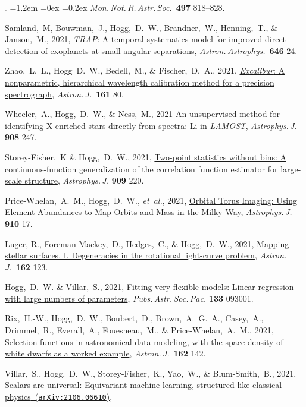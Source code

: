 \documentclass[10pt,letterpaper]{article}
\newcommand{\acronym}[1]{{\small{#1}}}
\newcommand{\foreign}[1]{\textsl{#1}}
\newcommand{\etal}{\foreign{et~al.}}
\newcommand{\project}[1]{\textsl{#1}}
\newcommand{\doi}[2]{\href{http://dx.doi.org/#1}{{#2}}}
\newcommand{\arxiv}[2]{\href{http://arxiv.org/abs/#1}{{#2}\ (\texttt{arXiv:#1})}}
\newcommand{\deemph}[1]{\textcolor{grey}{\footnotesize{#1}}}
\newcommand{\pubnumber}[1]{\deemph{{#1}.}}
\newcounter{refpubnum}
\newcommand{\hogglist}{%
    \rightmargin=0in
    \leftmargin=1.2em
    \topsep=0ex
    \partopsep=0pt
    \itemsep=0.2ex
    \parsep=0pt
    \itemindent=-1.0\leftmargin
    \listparindent=0.0\leftmargin
    \settowidth{\labelsep}{~}
    \usecounter{refpubnum}
  }
\begin{document}
\begin{list}{\pubnumber{\therefpubnum}}{\hogglist}
  \textit{Mon.\,Not.\,R.\,Astr.\,Soc.}\ \textbf{497} 818--828.
\item
  Samland,~M, Bouwman,~J., Hogg,~D.~W., Brandner,~W., Henning,~T., \& Janson,~M., 2021,
  \doi{10.1051/0004-6361/201937308}{\project{\acronym{TRAP}}: A temporal systematics model for improved direct detection of exoplanets at small angular separations},
  \textit{Astron.\,Astrophys.}\ \textbf{646} 24.
\item
  Zhao,~L.~L., Hogg~D.~W., Bedell,~M., \& Fischer,~D.~A., 2021,
  \doi{10.3847/1538-3881/abd105}{\project{Excalibur}: A nonparametric, hierarchical wavelength calibration method for a precision spectrograph},
  \textit{Astron.\,J.}\ \textbf{161} 80.
\item
  Wheeler,~A., Hogg,~D.~W., \& Ness,~M., 2021
  \doi{10.3847/1538-4357/abd544}{An unsupervised method for identifying X-enriched stars directly from spectra: Li in \project{\acronym{LAMOST}}},
  \textit{Astrophys.\,J.} \textbf{908} 247.
\item
  Storey-Fisher,~K \& Hogg,~D.~W., 2021,
  \doi{10.3847/1538-4357/abdc21}{Two-point statistics without bins: A continuous-function generalization of the correlation function estimator for large-scale structure},
  \textit{Astrophys.\,J.} \textbf{909} 220.
\item
  Price-Whelan,~A.~M., Hogg,~D.~W., \etal, 2021,
  \doi{10.3847/1538-4357/abe1b7}{Orbital Torus Imaging: Using Element Abundances to Map Orbits and Mass in the Milky Way},
  \textit{Astrophys.\,J.} \textbf{910} 17.
\item
  Luger, R., Foreman-Mackey,~D., Hedges,~C., \& Hogg,~D.~W., 2021,
  \doi{10.3847/1538-3881/abfdb8}{Mapping stellar surfaces. I. Degeneracies in the rotational light-curve problem},
  \textit{Astron.\,J.}\ \textbf{162} 123.
\item
  Hogg,~D.~W. \& Villar,~S., 2021,
  \doi{10.1088/1538-3873/ac20ac}{Fitting very flexible models: Linear regression with large numbers of parameters},
  \textit{Pubs.\,Astr.\,Soc.\,Pac.} \textbf{133} 093001.
\item
  Rix,~H.-W., Hogg,~D.~W., Boubert,~D., Brown,~A.~G.~A., Casey,~A.,
  Drimmel,~R., Everall,~A., Fouesneau,~M., \& Price-Whelan,~A.~M., 2021,
  \doi{10.3847/1538-3881/ac0c13}{Selection functions in astronomical data modeling, with the space density of white dwarfs as a worked example},
  \textit{Astron.\,J.}\ \textbf{162} 142.
\item
  Villar,~S., Hogg,~D.~W., Storey-Fisher,~K., Yao,~W., \& Blum-Smith,~B., 2021,
  \arxiv{2106.06610}{Scalars are universal: Equivariant machine learning, structured like classical physics},

\end{list}
\end{document}
